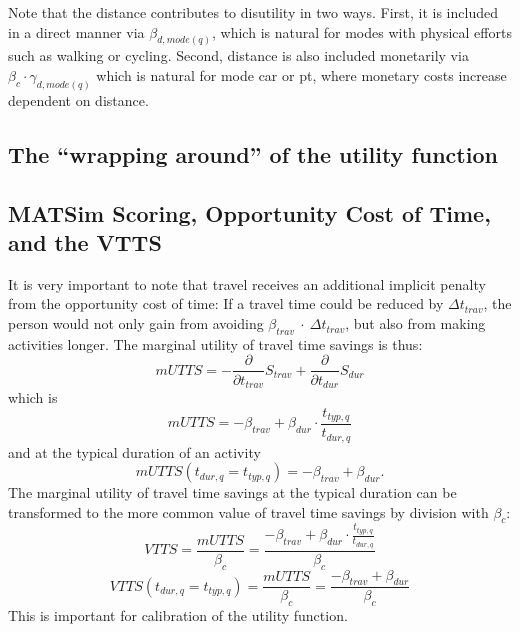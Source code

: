 Note that the distance contributes to disutility in two ways. First, it is included in a direct manner via $\beta_{d, mode(q)}$, which is natural for modes with physical efforts such as walking or cycling. Second, distance is also included monetarily via $\beta_c \cdot \gamma_{d, mode(q)}$ which is natural for mode car or pt, where monetary costs increase dependent on distance.




\subsection{The ``wrapping around'' of the utility function}
\label{sec:wrap-around}




\subsection{MATSim Scoring, Opportunity Cost of Time, and the VTTS}
\label{sec:opport-cost-of-time}


It is very important to note that travel receives an additional implicit penalty from the opportunity cost of time: If a travel time could be reduced by $\Delta t_{trav}$, the person would not only gain from avoiding $\beta_{trav}~\cdot~\Delta t_{trav}$, but also from making activities longer. The marginal utility of travel time savings is thus:
%
\[
mUTTS = - \frac{\partial}{\partial t_{trav}} S_{trav} + \frac{\partial}{\partial t_{dur}}S_{dur} 
\]
which is 
\begin{equation}
mUTTS = - \beta_{trav}
+  \beta_{dur} \cdot \frac{t_{typ,q}}{t_{dur,q}} 
\label{eq:mUTTSfull}
\end{equation}
and at the typical duration of an activity
\[
mUTTS(t_{dur,q} = t_{typ,q}) = - \beta_{trav} + \beta_{dur}.
\]
The marginal utility of travel time savings at the typical duration can be transformed to the more common value of travel time savings by division with $\beta_{c}$:
\[
VTTS = \frac{mUTTS}{\beta_{c}} = \frac{- \beta_{trav} + \beta_{dur} \cdot \frac{t_{typ,q}}{t_{dur,q}} }{\beta_{c}}
\]
\[
VTTS(t_{dur,q} = t_{typ,q}) = \frac{mUTTS}{\beta_{c}} = \frac{- \beta_{trav} + \beta_{dur}}{\beta_{c}}
\]
This is important for calibration of the utility function.

